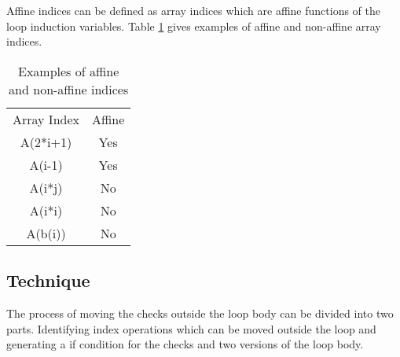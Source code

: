 Affine indices can be defined as array indices which are affine functions of the loop induction variables. Table \ref{tab:affineIndex} gives examples of affine and non-affine array indices. 
\begin{table}[htbp]
\centering
\begin{tabular}{|c|c|}
\hline
Array Index & Affine \\ \hhline{|=|=|}
A(2*i+1)    & Yes    \\ \hline
A(i-1)    & Yes    \\ \hline
A(i*j)      & No    \\ \hline
A(i*i)      & No     \\ \hline
A(b(i))     & No     \\ \hline
\end{tabular}
\caption{Examples of affine and non-affine indices}
\label{tab:affineIndex}
\end{table}
\subsection{Technique}

The process of moving the checks outside the loop body can be divided into two parts. Identifying index operations which can be moved outside the loop and generating a if condition for the checks and two versions of the loop body.   

